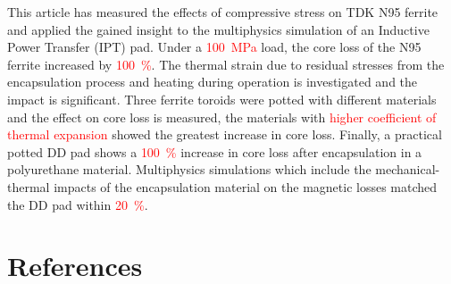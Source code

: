 \documentclass[conference]{IEEEtran}
\begin{document}
This article has measured the effects of compressive stress on TDK N95 ferrite and applied the gained insight to the multiphysics simulation of an Inductive Power Transfer (IPT) pad. 
Under a \textcolor{red}{\SI{100}{\mega\pascal}} load, the core loss of the N95 ferrite increased by \textcolor{red}{\SI{100}{\percent}}. 
The thermal strain due to residual stresses from the encapsulation process and heating during operation is investigated and the impact is significant. 
Three ferrite toroids were potted with different materials and the effect on core loss is measured, the materials with \textcolor{red}{higher coefficient of thermal expansion} showed the greatest increase in core loss. 
Finally, a practical potted DD pad shows a \textcolor{red}{\SI{100}{\percent}} increase in core loss after encapsulation in a polyurethane material. 
Multiphysics simulations which include the mechanical-thermal impacts of the encapsulation material on the magnetic losses matched the DD pad within \textcolor{red}{\SI{20}{\percent}}. 

\section*{References}
\printbibliography[heading=none]
\end{document}
